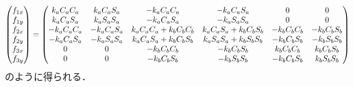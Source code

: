 \documentclass[a4paper,11pt,uplatex]{jsarticle}
\begin{document}
\begin{align}
  \begin{pmatrix} f_{1x} \\ f_{1y} \\ f_{2x} \\ f_{2y} \\ f_{3x} \\f_{3y} \end{pmatrix} = \begin{pmatrix} k_a C_aC_a & k_aC_aS_a& -k_aC_a C_a &-k_a C_aS_a&0&0 \\ k_aC_aS_a& k_aS_aS_a& -k_aC_aS_a
  & -k_aS_aS_a&0 &0\\ -k_aC_aC_a& -k_aC_aS_a & k_aC_aC_a + k_b C_bC_b& k_aC_aS_a +k_bC_bS_b &-k_bC_bC_b&-k_bC_bS_b\\ -k_aC_aS_a& -k_aS_aS_a& k_aC_aS_a + k_bC_bS_b
  & k_aS_aS_a + k_bS_bS_b&-k_bC_bS_b&-k_bS_bS_b \\ 0&0&-k_bC_bC_b & -k_bC_bS_b& k_bC_bC_b& k_bC_bS_b \\ 0&0&-k_bC_bS_b&-k_bS_bS_b &-k_bC_bS_b & k_bS_bS_b \end{pmatrix}
\end{align}
のように得られる．
\end{document}
